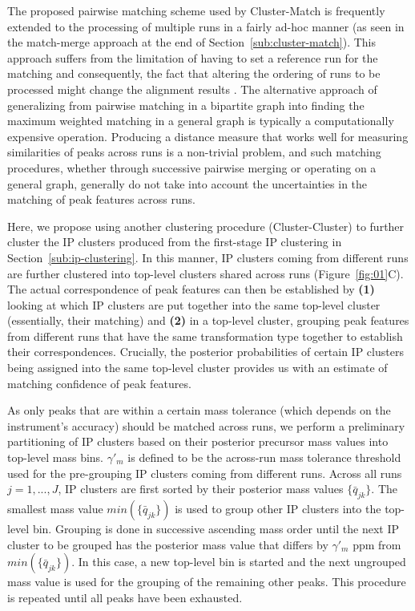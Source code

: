 The proposed pairwise matching scheme used by Cluster-Match is frequently extended to the processing of multiple runs in a fairly ad-hoc manner (as seen in the match-merge approach at the end of Section~\ref{sub:cluster-match}). This approach suffers from the limitation of having to set a reference run for the matching and consequently, the fact that altering the ordering of runs to be processed might change the alignment results \cite{Smith2013}. The alternative approach of generalizing from pairwise matching in a bipartite graph into finding the maximum weighted matching in a general graph is typically a computationally expensive operation. Producing a distance measure that works well for measuring similarities of peaks across runs is a non-trivial problem, and such matching procedures, whether through successive pairwise merging or operating on a general graph, generally do not take into account the uncertainties in the matching of peak features across runs.

Here, we propose using another clustering procedure (Cluster-Cluster) to further cluster the IP clusters produced from the first-stage IP clustering in Section~\ref{sub:ip-clustering}. In this manner, IP clusters coming from different runs are further clustered into top-level clusters shared across runs (Figure~\ref{fig:01}C). The actual correspondence of peak features can then be established by \textbf{(1)} looking at which IP clusters are put together into the same top-level cluster (essentially, their matching) and \textbf{(2)} in a top-level cluster, grouping peak features from different runs that have the same transformation type together to establish their correspondences. Crucially, the posterior probabilities of certain IP clusters being assigned into the same top-level cluster provides us with an estimate of matching confidence of peak features.

As only peaks that are within a certain mass tolerance (which depends on the instrument's accuracy) should be matched across runs, we perform a preliminary partitioning of IP clusters based on their posterior precursor mass values into top-level mass bins. $\gamma'_m$ is defined to be the across-run mass tolerance threshold used for the pre-grouping IP clusters coming from different runs. Across all runs $j=1,...,J$, IP clusters are first sorted by their posterior mass values $\{{\bar{q}}_{jk}\}$. The smallest mass value $min(\{{\bar{q}}_{jk}\})$ is used to group other IP clusters into the top-level bin. Grouping is done in successive ascending mass order until the next IP cluster to be grouped has the posterior mass value that differs by $\gamma'_m$ ppm from $min(\{{\bar{q}}_{jk}\})$. In this case, a new top-level bin is started and the next ungrouped mass value is used for the grouping of the remaining other peaks. This procedure is repeated until all peaks have been exhausted.


